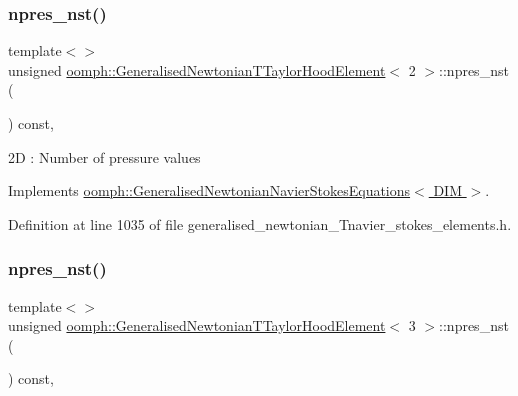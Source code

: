 \subsubsection{\texorpdfstring{npres\+\_\+nst()}{npres\_nst()}\hspace{0.1cm}{\footnotesize\ttfamily [2/3]}}
{\footnotesize\ttfamily template$<$$>$ \\
unsigned \hyperlink{classoomph_1_1GeneralisedNewtonianTTaylorHoodElement}{oomph\+::\+Generalised\+Newtonian\+T\+Taylor\+Hood\+Element}$<$ 2 $>$\+::npres\+\_\+nst (\begin{DoxyParamCaption}{ }\end{DoxyParamCaption}) const\hspace{0.3cm}{\ttfamily [inline]}, {\ttfamily [virtual]}}

2D \+: Number of pressure values 

Implements \hyperlink{classoomph_1_1GeneralisedNewtonianNavierStokesEquations_ad25a5d1b7a7e7cf128b9154f08739824}{oomph\+::\+Generalised\+Newtonian\+Navier\+Stokes\+Equations$<$ D\+I\+M $>$}.



Definition at line 1035 of file generalised\+\_\+newtonian\+\_\+\+Tnavier\+\_\+stokes\+\_\+elements.\+h.

\mbox{\label{classoomph_1_1GeneralisedNewtonianTTaylorHoodElement_aad5747c86300924ad3dfdf0144fa4c74}} 
\subsubsection{\texorpdfstring{npres\+\_\+nst()}{npres\_nst()}\hspace{0.1cm}{\footnotesize\ttfamily [3/3]}}
{\footnotesize\ttfamily template$<$$>$ \\
unsigned \hyperlink{classoomph_1_1GeneralisedNewtonianTTaylorHoodElement}{oomph\+::\+Generalised\+Newtonian\+T\+Taylor\+Hood\+Element}$<$ 3 $>$\+::npres\+\_\+nst (\begin{DoxyParamCaption}{ }\end{DoxyParamCaption}) const\hspace{0.3cm}{\ttfamily [inline]}, {\ttfamily [virtual]}}

